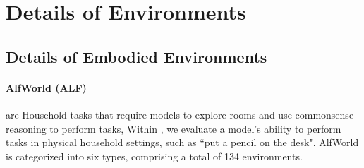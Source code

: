 

\section{Details of Environments}
\label{appendix:detail environment}

\subsection{Details of Embodied Environments}
 
\paragraph{AlfWorld (ALF)~\citep{shridhar2020alfworld}} are
Household tasks that require models to explore rooms and use commonsense reasoning to perform tasks, 
Within \BenchName, we evaluate a model's ability to perform tasks in physical household settings, 
such as ``put a pencil on the desk". 
AlfWorld is categorized into six types, comprising a total of 134 environments. 

